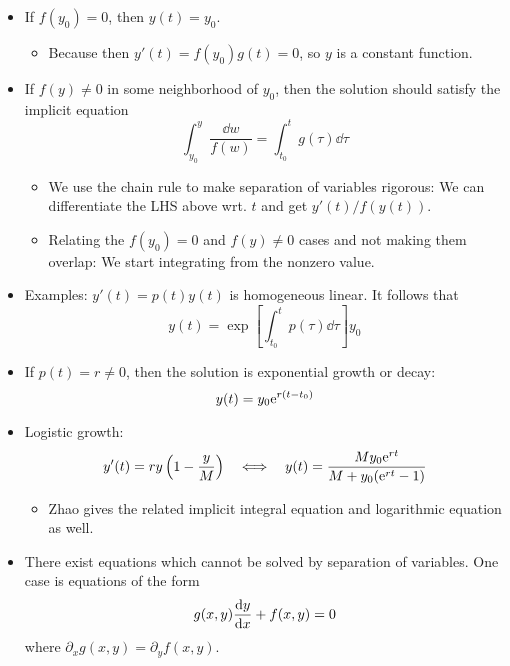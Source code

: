 \documentclass[../notes.tex]{subfiles}
\begin{document}
\begin{itemize}
    \item If $f(y_0)=0$, then $y(t)=y_0$.
    \begin{itemize}
        \item Because then $y'(t)=f(y_0)g(t)=0$, so $y$ is a constant function.
    \end{itemize}
    \item If $f(y)\neq 0$ in some neighborhood of $y_0$, then the solution should satisfy the implicit equation
    \begin{equation*}
        \int_{y_0}^y\frac{\dd{w}}{f(w)} = \int_{t_0}^tg(\tau)\dd\tau
    \end{equation*}
    \begin{itemize}
        \item We use the chain rule to make separation of variables rigorous: We can differentiate the LHS above wrt. $t$ and get $y'(t)/f(y(t))$.
        \item Relating the $f(y_0)=0$ and $f(y)\neq 0$ cases and not making them overlap: We start integrating from the nonzero value.
    \end{itemize}
    \item Examples: $y'(t)=p(t)y(t)$ is homogeneous linear. It follows that
    \begin{equation*}
        y(t) = \exp[\int_{t_0}^tp(\tau)\dd\tau]y_0
    \end{equation*}
    \item If $p(t)=r\neq 0$, then the solution is exponential growth or decay:
    \begin{equation*}
        y(t) = y_0\e[r(t-t_0)]
    \end{equation*}
    \item Logistic growth:
    \begin{equation*}
        y'(t) = ry\left( 1-\frac{y}{M} \right)
        \quad\Longleftrightarrow\quad
        y(t) = \frac{My_0\e[rt]}{M+y_0(\e[rt]-1)}
    \end{equation*}
    \begin{itemize}
        \item Zhao gives the related implicit integral equation and logarithmic equation as well.
    \end{itemize}
    \item There exist equations which cannot be solved by separation of variables. One case is equations of the form
    \begin{equation*}
        g(x,y)\dv{y}{x}+f(x,y) = 0
    \end{equation*}
    where $\partial_xg(x,y)=\partial_yf(x,y)$.

\end{itemize}
\end{document}
